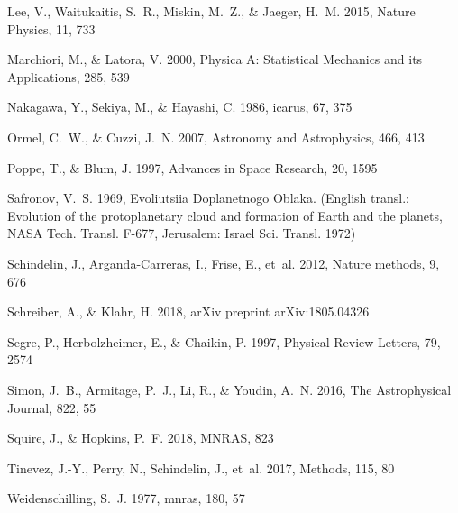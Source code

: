 \begin{thebibliography}{}
{Lee}, V., {Waitukaitis}, S.~R., {Miskin}, M.~Z., \& {Jaeger}, H.~M. 2015,
  Nature Physics, 11, 733

Marchiori, M., \& Latora, V. 2000, Physica A: Statistical Mechanics and its
  Applications, 285, 539

{Nakagawa}, Y., {Sekiya}, M., \& {Hayashi}, C. 1986, icarus, 67, 375

{Ormel}, C.~W., \& {Cuzzi}, J.~N. 2007, Astronomy and Astrophysics, 466, 413

Poppe, T., \& Blum, J. 1997, Advances in Space Research, 20, 1595

{Safronov}, V.~S. 1969, {Evoliutsiia Doplanetnogo Oblaka.} (English transl.:
  Evolution of the protoplanetary cloud and formation of Earth and the planets,
  NASA Tech. Transl. F-677, Jerusalem: Israel Sci. Transl. 1972)

Schindelin, J., Arganda-Carreras, I., Frise, E., {et~al.} 2012, Nature methods,
  9, 676

Schreiber, A., \& Klahr, H. 2018, arXiv preprint arXiv:1805.04326

Segre, P., Herbolzheimer, E., \& Chaikin, P. 1997, Physical Review Letters, 79,
  2574

Simon, J.~B., Armitage, P.~J., Li, R., \& Youdin, A.~N. 2016, The Astrophysical
  Journal, 822, 55

{Squire}, J., \& {Hopkins}, P.~F. 2018, MNRAS, 823

Tinevez, J.-Y., Perry, N., Schindelin, J., {et~al.} 2017, Methods, 115, 80

{Weidenschilling}, S.~J. 1977, mnras, 180, 57


\end{thebibliography}
